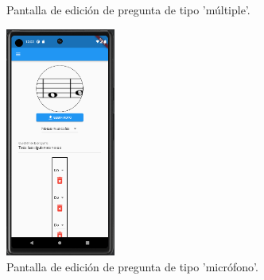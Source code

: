 \begin{figure}[H]%
  \centering
  \qquad
  \caption{Pantalla de edición de pregunta de tipo 'múltiple'.}%
  \label{fig:edición_pregunta_multiple}%
\end{figure}


\begin{figure}[H]
  \centering
  \includegraphics[width=0.32\textwidth]{imagenes/c7/editarpreguntamicrofono.png}
  \caption{Pantalla de edición de pregunta de tipo 'micrófono'.} 
  \label{fig:edición_pregunta_microfono}
\end{figure}

